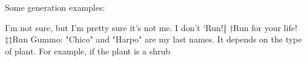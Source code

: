 Some generation examples:

I'm not sure, but I'm pretty sure it's not me. I don't
‘Run!‖ †Run for your life! ‡‡Run
Gummo: "Chico" and "Harpo" are my last names.
It depends on the type of plant. For example, if the plant is a shrub

